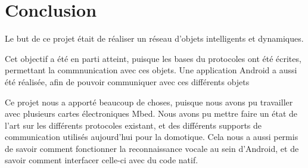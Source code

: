 \chapter*{Conclusion}

Le but de ce projet était de réaliser un réseau d'objets intelligents et dynamiques.

Cet objectif a été en parti atteint, puisque les bases du protocoles ont été écrites, permettant la 
commnunication avec ces objets. Une application Android a aussi été réalisée, afin de pouvoir communiquer 
avec ces différents objets

Ce projet nous a apporté beaucoup de choses, puisque nous avons pu travailler avec plusieurs cartes 
électroniques Mbed. Nous avons pu mettre faire un état de l'art sur les différents protocoles existant, et 
des différents supports de communication utilisés aujourd'hui pour la domotique. Cela nous a aussi permis de 
savoir comment fonctionner la reconnaissance vocale au sein d'Android, et de savoir comment interfacer 
celle-ci avec du code natif.